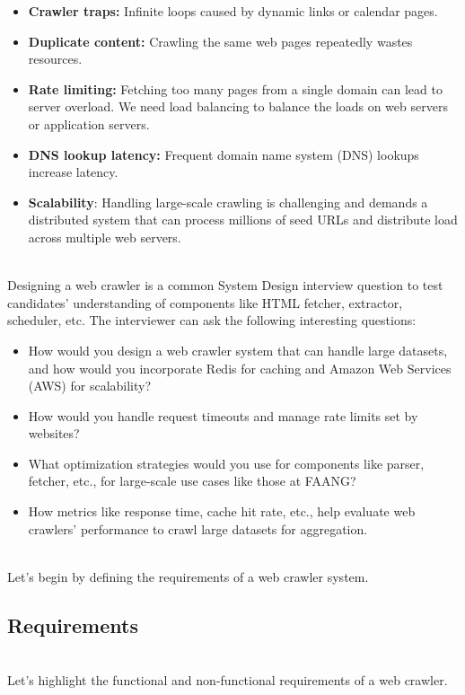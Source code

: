 \begin{itemize}
\item
\protect{}\label{mPr-op1GKOdkM7peUAAP-}
\textbf{Crawler traps:} Infinite loops caused by dynamic links or calendar pages.
\item
\protect{}\label{BYpBu4HhC8AWMcaVlWhTo}
\textbf{Duplicate content:} Crawling the same web pages repeatedly wastes resources.
\item
\protect{}\label{-6ORkA8SLNL0UId1MaVCM}
\textbf{Rate limiting:} Fetching too many pages from a single domain can lead to server overload. We need load balancing to balance the loads on web servers or application servers.
\item
\protect{}\label{7CNrjgX6qc_W6TjX_PEOb}
\textbf{DNS lookup latency:} Frequent domain name system (DNS) lookups increase latency.
\item
\protect{}\label{IhxdB1Tvs8Gaef8OCmNLE}
\textbf{Scalability}: Handling large-scale crawling is challenging and demands a distributed system that can process millions of seed URLs and distribute load across multiple web servers.
\end{itemize}
\\
Designing a web crawler is a common System Design interview question to test candidates' understanding of components like HTML fetcher, extractor, scheduler, etc. The interviewer can ask the following interesting questions:

\begin{itemize}
\item
How would you design a web crawler system that can handle large datasets, and how would you incorporate Redis for caching and Amazon Web Services (AWS) for scalability?
\item
How would you handle request timeouts and manage rate limits set by websites?
\item
What optimization strategies would you use for components like parser, fetcher, etc., for large-scale use cases like those at FAANG?
\item
How metrics like response time, cache hit rate, etc., help evaluate web crawlers' performance to crawl large datasets for aggregation.
\end{itemize}
\\
Let's begin by defining the requirements of a web crawler system.

\subsection{Requirements}\label{YT6t3M-yrq31Rs76iqETT}
\\
Let's highlight the functional and non-functional requirements of a web crawler.

